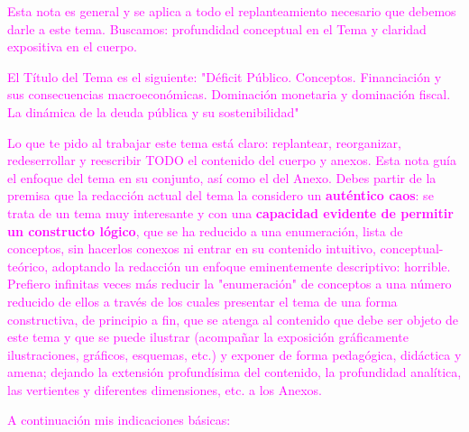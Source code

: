 \documentclass[10pt,a4paper]{article}
\newcounter{anexo}
\begin{document}
{    \textcolor{magenta}{Esta nota es general y se aplica a todo el replanteamiento necesario que debemos darle a este tema. Buscamos: profundidad conceptual en el Tema y claridad expositiva en el cuerpo.

    El Título del Tema es el siguiente: "Déficit Público. Conceptos. Financiación y sus consecuencias macroeconómicas. Dominación monetaria y dominación fiscal. La dinámica de la deuda pública y su sostenibilidad"

    Lo que te pido al trabajar este tema está claro: replantear, reorganizar, redeserrollar y reescribir TODO el contenido del cuerpo y anexos. Esta nota guía el enfoque del tema en su conjunto, así como el del Anexo. Debes partir de la premisa que la redacción actual del tema la considero un \textbf{auténtico caos}: se trata de un tema muy interesante y con una \textbf{capacidad evidente de permitir un constructo lógico}, que se ha reducido a una enumeración, lista de conceptos, sin hacerlos conexos ni entrar en su contenido intuitivo, conceptual-teórico, adoptando la redacción un enfoque eminentemente descriptivo: horrible. Prefiero infinitas veces más reducir la "enumeración" de conceptos a una número reducido de ellos a través de los cuales presentar el tema de una forma constructiva, de principio a fin, que se atenga al contenido que debe ser objeto de este tema y que se puede ilustrar (acompañar la exposición gráficamente ilustraciones, gráficos, esquemas, etc.) y exponer de forma pedagógica, didáctica y amena; dejando la extensión profundísima del contenido, la profundidad analítica, las vertientes y diferentes dimensiones, etc. a los Anexos.
    
    A continuación mis indicaciones básicas:
    
}}
\end{document}
